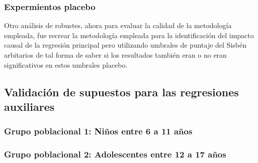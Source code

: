 \documentclass[AER]{AEA}
\begin{document}
\subsubsection{Expermientos placebo}

Otro análisis de robustes, ahora para evaluar la calidad de la metodología empleada, fue recrear la metodología empleada para la identificación del impacto causal de la regresión principal pero utilizando umbrales de puntaje del Sisbén arbitarios de tal forma de saber si los resultados también eran o no eran significativos en estos umbrales placebo. 




\subsection{Validación de supuestos para las regresiones auxiliares}

\subsubsection{Grupo poblacional 1: Niños entre 6 a 11 años}



\subsubsection{Grupo poblacional 2: Adolescentes entre 12 a 17 años}



\newpage


\end{document}
